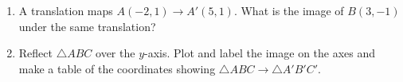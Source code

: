 \documentclass[12pt, twoside]{article}
\begin{document}
\begin{enumerate}
  \item A translation maps $A(-2, 1) \rightarrow A'(5,1)$. What is the image of $B(3,-1)$ under the same translation? \vspace{1cm}

  \item Reflect $\triangle ABC$ over the $y$-axis. Plot and label the image on the axes and make a table of the coordinates showing $\triangle ABC \rightarrow \triangle A'B'C'$.
  \begin{flushright}
  \end{flushright}

\end{enumerate}
\end{document}
